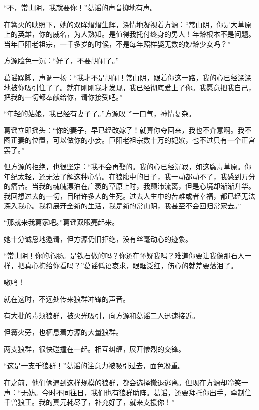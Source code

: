 
\begin{this_body}



“不，常山阴，我就要你！”葛谣的声音掷地有声。

在篝火的映照下，她的双眸熠熠生辉，深情地凝视着方源：“常山阴，你是大草原上的英雄，你的威名，为人熟知。是值得我托付终身的男人！年龄根本不是问题。当年巨阳老祖宗，一千多岁的时候，不是每年照样娶无数的妙龄少女吗？”

方源脸色一沉：“好了，不要胡闹了。”

葛谣跺脚，声调一扬：“我才不是胡闹！常山阴，跟着你这一路，我的心已经深深地被你吸引住了了。就在刚刚我才发现，我已经彻底爱上了你。我愿意把我自己，把我的一切都奉献给你，请你接受吧。”

“年轻的姑娘，我已经有妻子了。”方源叹了一口气，神情复杂。

葛谣立即摇头：“你的妻子，早已经改嫁了！就算你夺回来，我也不介意啊。我不图正妻的位置，可以做你的小妾。巨阳老祖宗数十万的妃嫔，也不过只有一个正宫罢了。”

但方源的拒绝，也很坚定：“我不会再娶的。我的心已经沉寂，如这腐毒草原。你年纪太轻，还无法了解这种心情。在狼腹中的日子，我一动都动不了，我感到万分的痛苦。当我的魂魄漂泊在广袤的草原上时，我颠沛流离，但是心境却渐渐升华。我回想过去的一切，目睹许多人的生死。过去人生中的苦难或者幸福，都已经无法深入我心。我将展开全新的生活，我是新的常山阴，我甚至不会回归常家去。”

“那就来我葛家吧。”葛谣双眼亮起来。

她十分诚恳地邀请，但方源仍旧拒绝，没有丝毫动心的迹象。

“常山阴！你的心肠。是铁石做的吗？你还在怀疑我吗？难道你要让我像那石人一样，把真心掏给你看吗？”葛谣低语哀求，眼眶泛红，伤心的就差要落泪了。

嗷呜！

就在这时，不远处传来狼群冲锋的声音。

有大批的毒须狼群，被火光吸引，向方源和葛谣二人迅速接近。

但篝火旁，也栖息着方源的大量狼群。

两支狼群，很快碰撞在一起。相互纠缠，展开惨烈的交锋。

“这是一支千狼群！”葛谣的注意力被吸引过去，面色凝重。

在之前，他们俩遇到这样规模的狼群，都会选择撤退逃离。但现在方源却冷笑一声：“无妨。今时不同往日，我们也有狼群助阵。葛谣，还要拜托你出手，牵制住千兽狼王。我的真元耗尽了，补充好了，就来支援你！”


\end{this_body}
